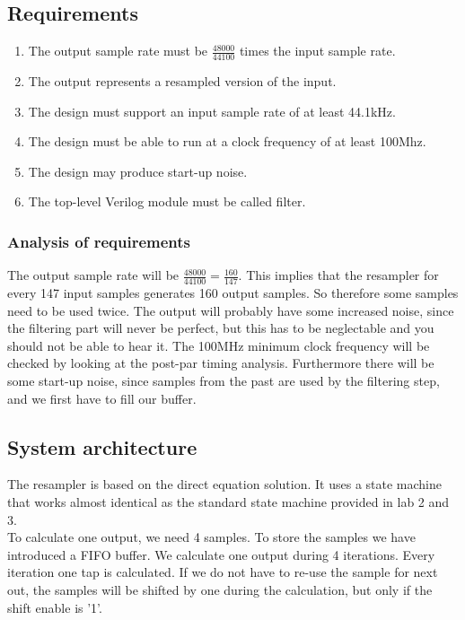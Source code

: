\documentclass[a4paper,twoside,11pt, fleqn]{article}
\begin{document}
\subsection{Requirements}
\label{sec:req}

\begin{enumerate}
	\item The output sample rate must be $\frac{48000}{44100}$ times the input sample rate.
	\item The output represents a resampled version of the input.
	\item The design must support an input sample rate of at least 44.1kHz.
	\item The design must be able to run at a clock frequency of at least 100Mhz.
	\item The design may produce start-up noise.
	\item The top-level Verilog module must be called filter.
\end{enumerate}

\subsubsection{Analysis of requirements}
The output sample rate will be $\frac{48000}{44100} = \frac{160}{147}$. This implies that the resampler for every 147 input samples generates 160 output samples. So therefore some samples need to be used twice. The output will probably have some increased noise, since the filtering part will never be perfect, but this has to be neglectable and you should not be able to hear it. The 100MHz minimum clock frequency will be checked by looking at the post-par timing analysis. Furthermore there will be some start-up noise, since samples from the past are used by the filtering step, and we first have to fill our buffer.

\newpage
\subsection{System architecture}
The resampler is based on the direct equation solution. It uses a state machine that works almost identical as the standard state machine provided in lab 2 and 3. \\

To calculate one output, we need 4 samples. To store the samples we have introduced a FIFO buffer. We calculate one output during 4 iterations.  Every iteration one tap is calculated. If we do not have to re-use the sample for next out, the samples will be shifted by one during the calculation, but only if the shift enable is '1'.\\
\end{document}
